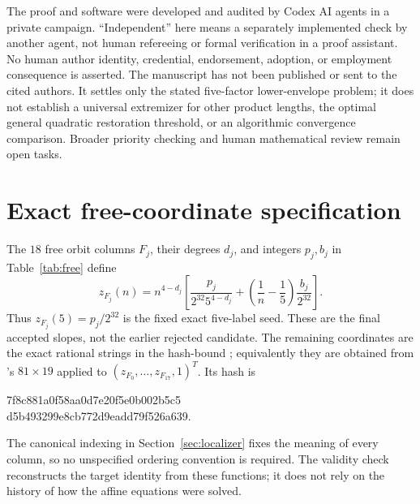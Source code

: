 \documentclass[11pt]{article}
\begin{document}
The proof and software were developed and audited by Codex AI agents
in a private campaign. ``Independent'' here means a separately
implemented check by another agent, not human refereeing or formal
verification in a proof assistant. No human author identity, credential,
endorsement, adoption, or employment consequence is asserted.
The manuscript has not been published or sent to the cited authors.
It settles only the stated five-factor lower-envelope problem; it does
not establish a universal extremizer for other product lengths, the
optimal general quadratic restoration threshold, or an algorithmic
convergence comparison. Broader priority checking and human mathematical
review remain open tasks.

\appendix
\section{Exact free-coordinate specification}\label{app:coordinates}
The $18$ free orbit columns $F_j$, their degrees $d_j$, and integers
$p_j,b_j$ in Table~\ref{tab:free} define
\begin{equation}\label{eq:free}
 z_{F_j}(n)=n^{4-d_j}\left[
 \frac{p_j}{2^{32}5^{4-d_j}}+
 \left(\frac1n-\frac15\right)\frac{b_j}{2^{32}}\right].
\end{equation}
Thus $z_{F_j}(5)=p_j/2^{32}$ is the fixed exact five-label seed.
These are the final accepted slopes, not the earlier rejected candidate.
The remaining coordinates are the exact rational strings in the
hash-bound ; equivalently they are obtained
from 's $81\times19$
 applied to
$(z_{F_0},\ldots,z_{F_{17}},1)^T$.
Its hash is
\begin{center}\footnotesize\ttfamily
 7f8c881a0f58aa0d7e20f5e0b002b5c5\\
 d5b493299e8cb772d9eadd79f526a639.
\end{center}
The canonical indexing in Section~\ref{sec:localizer} fixes the meaning
of every column, so no unspecified ordering convention is required.
The validity check reconstructs the target identity from these functions;
it does not rely on the history of how the affine equations were solved.
\end{document}
